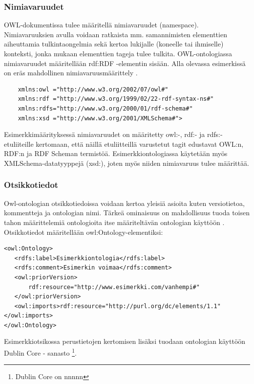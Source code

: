 \documentclass[finnish]{tktltiki2}
\theoremstyle{definition}
\theoremstyle{remark}
\begin{document}
\subsubsection{Nimiavaruudet}
OWL-dokumentissa tulee määritellä nimiavaruudet (namespace). Nimiavaruuksien
avulla voidaan ratkaista mm. samannimisten elementtien aiheuttamia
tulkintaongelmia sekä kertoa lukijalle (koneelle tai ihmiselle) konteksti, jonka
mukaan elementtien tageja tulee tulkita. OWL-ontologiassa nimiavaruudet
määritellään rdf:RDF -elementin sisään.  Alla olevassa esimerkissä on eräs mahdollinen nimiavaruusmäärittely . 
\begin{verbatim}
    xmlns:owl ="http://www.w3.org/2002/07/owl#"
    xmlns:rdf ="http://www.w3.org/1999/02/22-rdf-syntax-ns#"
    xmlns:rdfs="http://www.w3.org/2000/01/rdf-schema#"
    xmlns:xsd ="http://www.w3.org/2001/XMLSchema#">
\end{verbatim}
Esimerkkimäärityksessä nimiavaruudet on määritetty owl:-, rdf:- ja rdfs:-etuliiteille kertomaan, että näillä
etuliitteillä varustetut tagit edustavat OWL:n, RDF:n ja RDF Scheman termistöä.
Esimerkkiontologiassa käytetään myös XMLSchema-datatyyppejä (xsd:), joten myös niiden
nimiavaruus tulee määrittää. 

\subsubsection{Otsikkotiedot}
Owl-ontologian otsikkotiedoissa voidaan kertoa yleisiä asioita kuten versiotietoa, kommentteja ja ontologian nimi. Tärkeä ominaisuus on mahdollisuus tuoda toisen tahon määrittelemiä ontologioita itse määriteltävän ontologian käyttöön \cite{SWM04}. Otsikkotiedot määritellään owl:Ontology-elementiksi: 
\begin{verbatim}
<owl:Ontology>
   <rdfs:label>Esimerkkiontologia</rdfs:label>
   <rdfs:comment>Esimerkin voimaa</rdfs:comment>
   <owl:priorVersion>
       rdf:resource="http://www.esimerkki.com/vanhempi#"
   </owl:priorVersion>
   <owl:imports>rdf:resource="http://purl.org/dc/elements/1.1"</owl:imports>
</owl:Ontology>
\end{verbatim}
Esimerkkiotsikossa perustietojen kertomisen lisäksi tuodaan ontologian käyttöön Dublin Core - sanasto  \footnote{Dublin Core on nnnnn}. 
\end{document}
